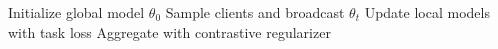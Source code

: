 \begin{algorithm}[t]
\caption{FedContra training loop.}
\label{alg:fedcontra}
\begin{algorithmic}
\STATE Initialize global model $\theta_0$
\STATE Sample clients and broadcast $\theta_t$
\STATE Update local models with task loss
\STATE Aggregate with contrastive regularizer
\ENDFOR
\end{algorithmic}
\end{algorithm}
